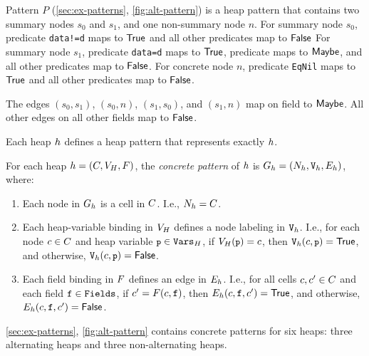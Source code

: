 \begin{ex}
  \label{ex:heap-pats-defn}
  Pattern $P$ (\autoref{sec:ex-patterns}, \autoref{fig:alt-pattern})
  is a heap pattern
  that contains two summary nodes $s_0$ and $s_1$, and one non-summary
  node $n$.
  For summary node $s_0$, predicate \texttt{data!=d} maps to $\mathsf{True}$
  and all other predicates map to $\mathsf{False}$
  For summary node $s_1$, predicate \texttt{data=d} maps to $\mathsf{True}$,
  predicate \lsnm maps to $\mathsf{Maybe}$, and all other predicates map to
  $\mathsf{False}$.
  For concrete node $n$, predicate \texttt{EqNil} maps to $\mathsf{True}$ and
  all other predicates map to $\mathsf{False}$.

  The edges $(s_0, s_1)$, $(s_0, n)$, $(s_1, s_0)$, and $(s_1, n)$ map
  on field \nextnm to $\mathsf{Maybe}$.
  All other edges on all other fields map to $\mathsf{False}$.
\end{ex}

Each heap $h$ defines a heap pattern that represents exactly
$h$.
%
\begin{defn}
  \label{defn:heap-pat}
  For each heap $h = (C, V_H, F)$, the
  \emph{concrete pattern} of $h$ is $G_{h} =
  (N_{h}, \mathtt{V}_{h}, E_{h})$,
  where:
  \begin{enumerate}
  \item
    Each node in $G_{h}$ is a cell in $C$.
    I.e., $N_{h} = C$.
  \item
    Each heap-variable binding in $V_H$ defines a node labeling
    in $\mathtt{V}_{h}$.
    I.e., for each node $c \in C$ and heap variable $\cc{p} \in
    \heapvars$, if $\heapvarnm(\cc{p}) = c$, then
    $\varlblnm_{\heapnm}(c, \cc{p}) = \true$, and otherwise,
    $\varlblnm_{\heapnm}(c, \cc{p}) = \false$.
  \item
    Each field binding in $F$ defines an edge in
    $E_{h}$.
    I.e., for all cells $c, c' \in C$ and each
    field $\mathtt{f} \in \mathtt{Fields}$, if $c' = F(c,
    \mathtt{f})$, then $E_{h}(c, \mathtt{f}, c')
    = \mathsf{True}$, and otherwise, $E_{h}(c, \mathtt{f},
    c') = \mathsf{False}$.
  \end{enumerate}
\end{defn}
\begin{ex}
  \label{ex:concrete-heaps-defn}
  \autoref{sec:ex-patterns}, \autoref{fig:alt-pattern} contains
  concrete patterns for six heaps: three alternating heaps and three
  non-alternating heaps.
\end{ex}

